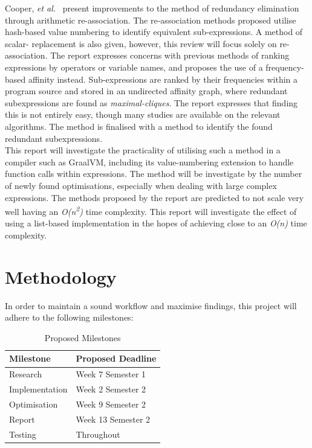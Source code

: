 \documentclass[12pt,openany,a4paper]{book}
\begin{document}
Cooper, \emph{et al.}~\cite{redund} present improvements to the method of redundancy elimination through
arithmetic re-association. The re-association methods proposed utilise hash-based
value numbering to identify equivalent sub-expressions. A method of scalar-
replacement is also given, however, this review will focus solely on re-association.
The report expresses concerns with previous methods of ranking expressions 
by operators or variable names, and proposes the use of a frequency-based affinity
instead. Sub-expressions are ranked by their frequencies within a program source and
stored in an undirected affinity graph, where redundant subexpressions are found
as \emph{maximal-cliques}. The report expresses that finding this is not
entirely easy, though many studies are available on the relevant algorithms.
The method is finalised with a method to identify the found redundant subexpressions.\\
This report will investigate the practicality of utilising such a method in a
compiler such as GraalVM, including its value-numbering extension to handle
function calls within expressions. The method will be investigate by
the number of newly found optimisations, especially when dealing with large
complex expressions. The methods proposed by the report are predicted to
not scale very well having an \emph{O(n\textsuperscript{2})} time complexity.
This report will investigate the effect of using a list-based implementation in
the hopes of achieving close to an \emph{O(n)} time complexity.

\chapter{Methodology}
\label{methods}

In order to maintain a sound workflow and maximise findings, this project will
adhere to the following milestones:

\begin{table}[ht]
    \begin{center}
        \begin{tabular}{ |p{8cm}|p{4cm}| }
            \hline
            \textbf{Milestone} & \textbf{Proposed Deadline}\\
            \hline
            Research & Week 7 Semester 1\\
            \hline
            Implementation & Week 2 Semester 2\\
            \hline
            Optimisation & Week 9 Semester 2\\
            \hline
            Report & Week 13 Semester 2\\
            \hline
            Testing & Throughout\\
            \hline
        \end{tabular}
        \caption{Proposed Milestones}
        \label{milestones}
    \end{center}
\end{table}
\end{document}
